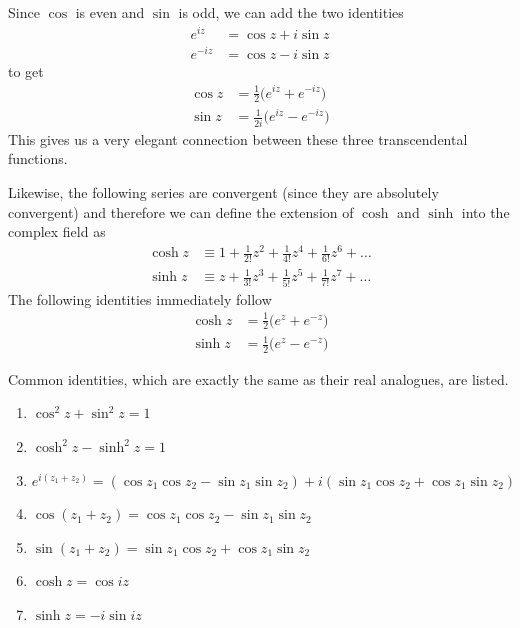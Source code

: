 \documentclass{article}
\begin{document}
      Since $\cos$ is even and $\sin$ is odd, we can add the two identities
      \begin{align*}
          e^{iz} & = \cos{z} + i \sin{z} \\
          e^{-iz} & = \cos{z} - i \sin{z} 
      \end{align*}
      to get 
      \begin{align*}
          \cos{z} & = \frac{1}{2}\big( e^{iz} + e^{-iz} \big) \\
          \sin{z} & = \frac{1}{2i} \big( e^{iz} - e^{-iz} \big)
      \end{align*}
      This gives us a very elegant connection between these three transcendental functions. 

      \begin{definition}
        Likewise, the following series are convergent (since they are absolutely convergent) and therefore we can define the extension of $\cosh$ and $\sinh$ into the complex field as 
        \begin{align*}
            \cosh{z} & \equiv 1 + \frac{1}{2!} z^2 + \frac{1}{4!} z^4 + \frac{1}{6!} z^6 + \ldots \\
            \sinh{z} & \equiv z + \frac{1}{3!} z^3 + \frac{1}{5!} z^5 + \frac{1}{7!} z^7 + \ldots 
        \end{align*}
        The following identities immediately follow
        \begin{align*}
            \cosh{z} & = \frac{1}{2} \big( e^z + e^{-z} \big) \\
            \sinh{z} & = \frac{1}{2} \big( e^{z} - e^{-z}\big) 
        \end{align*}
      \end{definition}

      \begin{lemma}
        Common identities, which are exactly the same as their real analogues, are listed. 
        \begin{enumerate}
          \item $\cos^2{z} + \sin^2 {z} = 1$
          \item $\cosh^2{z} - \sinh^2{z} = 1$ 
          \item $e^{i(z_1 + z_2)} = (\cos{z_1} \cos{z_2} - \sin{z_1} \sin{z_2}) + i (\sin{z_1} \cos{z_2} + \cos{z_1} \sin{z_2})$
          \item $\cos{(z_1 + z_2)} = \cos{z_1} \cos{z_2} - \sin{z_1} \sin{z_2}$
          \item $\sin{(z_1 + z_2)} = \sin{z_1} \cos{z_2} + \cos{z_1} \sin{z_2}$
          \item $\cosh{z} = \cos{iz}$ 
          \item $\sinh{z} = -i \sin{iz}$
        \end{enumerate}
      \end{lemma}
\end{document}
